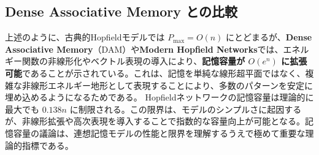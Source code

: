\subsection{Dense Associative Memory との比較}
上述のように、古典的Hopfieldモデルでは $P_{\max} = O(n)$ にとどまるが、\textbf{Dense Associative Memory}（DAM）や\textbf{Modern Hopfield Networks}では、エネルギー関数の非線形化やベクトル表現の導入により、\textbf{記憶容量が $O(e^n)$ に拡張可能}であることが示されている。これは、記憶を単純な線形超平面ではなく、複雑な非線形エネルギー地形として表現することにより、多数のパターンを安定に埋め込めるようになるためである。
Hopfieldネットワークの記憶容量は理論的に最大でも $0.138n$ に制限される。この限界は、モデルのシンプルさに起因するが、非線形拡張や高次表現を導入することで指数的な容量向上が可能となる。記憶容量の議論は、連想記憶モデルの性能と限界を理解するうえで極めて重要な理論的指標である。
